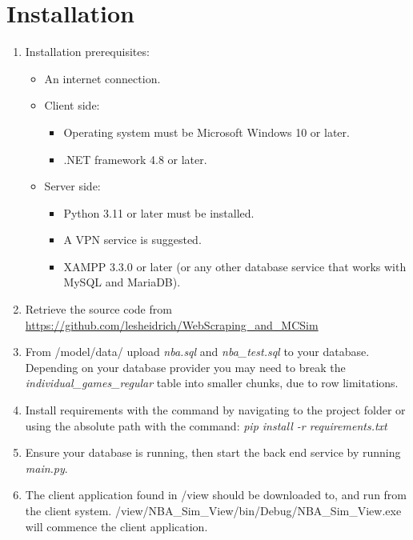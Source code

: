 \documentclass{thesis-ekf}
\theoremstyle{definition}
\theoremstyle{remark}
\begin{document}
\section{Installation}
\begin{enumerate}
	\item Installation prerequisites:
	\begin{itemize}
		\item An internet connection.
		\item Client side:
		\begin{itemize}
			\item Operating system must be Microsoft Windows 10 or later.
			\item .NET framework 4.8 or later.
		\end{itemize}
		
		\item Server side:
		\begin{itemize}
			\item Python 3.11 or later must be installed.
			\item A VPN service is suggested.
			\item XAMPP 3.3.0 or later (or any other database service that works with MySQL and MariaDB).
		\end{itemize}
	\end{itemize}
	
	\item Retrieve the source code from \url{https://github.com/lesheidrich/WebScraping_and_MCSim}
	
	\item From /model/data/ upload \emph{nba.sql} and \emph{nba\_test.sql} to your database. Depending on your database provider you may need to break the \emph{individual\_games\_regular} table into smaller chunks, due to row limitations.
	
	\item Install requirements with the command by navigating to the project folder or using the absolute path with the command: \emph{pip install -r requirements.txt}
	
	\item Ensure your database is running, then start the back end service by running \emph{main.py}.
	
	\item The client application found in /view should be downloaded to, and run from the client system. /view/NBA\_Sim\_View/bin/Debug/NBA\_Sim\_View.exe will commence the client application.
\end{enumerate}
\end{document}
